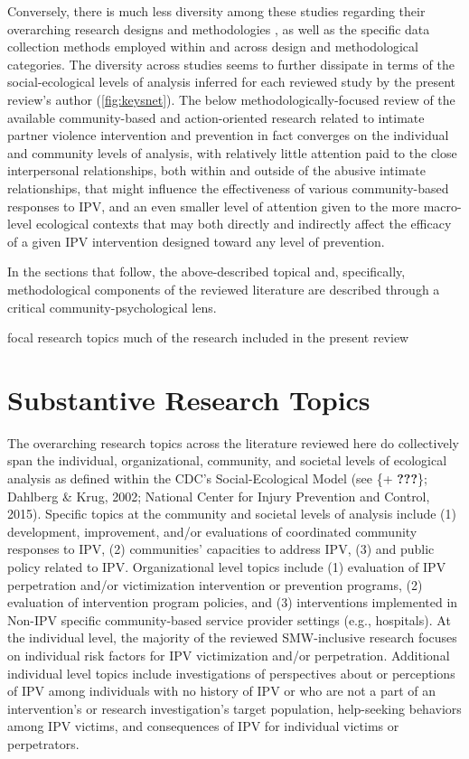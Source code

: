 \documentclass[11pt,]{tufte-book}
\begin{document}
Conversely, there is much less diversity among these studies regarding
their overarching research designs and methodologies , as well as the
specific data collection methods employed within and across design and
methodological categories. The diversity across studies seems to further
dissipate in terms of the social-ecological levels of analysis inferred
for each reviewed study by the present review's author
(\cref{fig:keysnet}). The below
methodologically-focused review of the available community-based and
action-oriented research related to intimate partner violence
intervention and prevention in fact converges on the individual and
community levels of analysis, with relatively little attention paid to
the close interpersonal relationships, both within and outside of the
abusive intimate relationships, that might influence the effectiveness
of various community-based responses to IPV, and an even smaller level
of attention given to the more macro-level ecological contexts that may
both directly and indirectly affect the efficacy of a given IPV
intervention designed toward any level of prevention.

In the sections that follow, the above-described topical and,
specifically, methodological components of the reviewed literature are
described through a critical community-psychological lens.

focal research topics much of the research included in the present
review

\section{Substantive Research Topics}\label{substantive-research-topics}

The overarching research topics across the literature reviewed here do
collectively span the individual, organizational, community, and
societal levels of ecological analysis as defined within the CDC's
Social-Ecological Model (see \{+ {\textbf{???}}\}; Dahlberg \& Krug,
2002; National Center for Injury Prevention and Control, 2015). Specific
topics at the community and societal levels of analysis include (1)
development, improvement, and/or evaluations of coordinated community
responses to IPV, (2) communities' capacities to address IPV, (3) and
public policy related to IPV. Organizational level topics include (1)
evaluation of IPV perpetration and/or victimization intervention or
prevention programs, (2) evaluation of intervention program policies,
and (3) interventions implemented in Non-IPV specific community-based
service provider settings (e.g., hospitals). At the individual level,
the majority of the reviewed SMW-inclusive research focuses on
individual risk factors for IPV victimization and/or perpetration.
Additional individual level topics include investigations of
perspectives about or perceptions of IPV among individuals with no
history of IPV or who are not a part of an intervention's or research
investigation's target population, help-seeking behaviors among IPV
victims, and consequences of IPV for individual victims or perpetrators.
\end{document}
